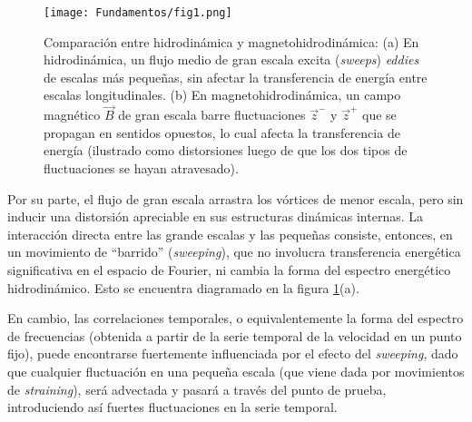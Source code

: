 \begin{figure}[h]
  \centering
  \texttt{[image: Fundamentos/fig1.png]}
  \caption{Comparación entre hidrodinámica y magnetohidrodinámica: (a)
    En hidrodinámica, un flujo medio de gran escala excita
    (\emph{sweeps}) \emph{eddies} de escalas más pequeñas, sin
    afectar la transferencia de energía entre escalas
    longitudinales. (b) En magnetohidrodinámica, un campo magnético
    $\vec{B}$ de gran escala barre fluctuaciones $\vec{z}^-$ y
    $\vec{z}^+$ que se propagan en sentidos opuestos, lo cual afecta
    la transferencia de energía (ilustrado como distorsiones luego de
    que los dos tipos de fluctuaciones se hayan atravesado).}
  \label{fig:HDvsMHD}
\end{figure}



Por su parte, el flujo de gran escala arrastra los vórtices de menor
escala, pero sin inducir una distorsión apreciable en sus estructuras
dinámicas internas. La interacción directa entre las grande escalas y
las pequeñas consiste, entonces, en un movimiento de ``barrido''
(\textit{sweeping}), que no involucra transferencia energética
significativa en el espacio de Fourier, ni cambia la forma del
espectro energético hidrodinámico. Esto se encuentra diagramado en la
figura \ref{fig:HDvsMHD}(a).

En cambio, las correlaciones temporales, o equivalentemente la forma
del espectro de frecuencias (obtenida a partir de la serie temporal de
la velocidad en un punto fijo), puede encontrarse fuertemente
influenciada por el efecto del \textit{sweeping}, dado que cualquier
fluctuación en una pequeña escala (que viene dada por movimientos de
\textit{straining}), será advectada y pasará a través del punto de
prueba, introduciendo así fuertes fluctuaciones en la serie temporal.

